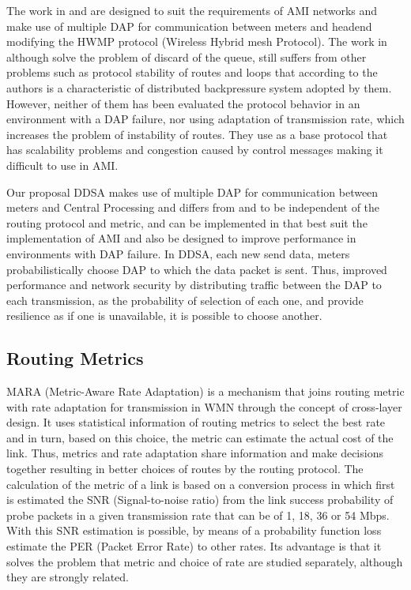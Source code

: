 \documentclass[conference]{IEEEtran}
\begin{document}
The work in \cite{6412861} and \cite{Gharavi2011} are designed to suit the requirements of AMI networks and make use of multiple DAP for communication between meters and headend modifying the HWMP protocol (Wireless Hybrid mesh Protocol). The work in \cite{Gharavi2011} although solve the problem of discard of the queue, still suffers from other problems such as protocol stability of routes and loops that according to the authors is a characteristic of distributed backpressure system adopted by them. However, neither of them has been evaluated the protocol behavior in an environment with a DAP failure, nor using adaptation of transmission rate, which increases the problem of instability of routes. They use as a base protocol that has scalability problems and congestion caused by control messages \cite{5473885} making it difficult to use in AMI.


Our proposal DDSA makes use of multiple DAP for communication between meters and Central Processing and differs from \cite{6412861} and \cite{Gharavi2011} to be independent of the routing protocol and metric, and can be implemented in that best suit the implementation of AMI and also be designed to improve performance in environments with DAP failure.
In DDSA, each new send data, meters probabilistically choose DAP to which the data packet is sent. 
Thus, improved performance and network security by distributing traffic between the DAP to each transmission, as the probability of selection of each one, and provide resilience as if one is unavailable, it is possible to choose another.


\subsection{Routing Metrics}
 

MARA (Metric-Aware Rate Adaptation) \cite{6051505} is a mechanism that joins routing metric with rate adaptation for transmission in WMN through the concept of cross-layer design.
It uses statistical information of routing metrics to select the best rate and in turn, based on this choice, the metric can estimate the actual cost of the link.
Thus, metrics and rate adaptation share information and make decisions together resulting in better choices of routes by the routing protocol.
The calculation of the metric of a link is based on a conversion process in which first is estimated the SNR (Signal-to-noise ratio) from the link success probability of probe packets in a given transmission rate that can be of 1, 18, 36 or 54 Mbps.
With this SNR estimation is possible, by means of a probability function loss estimate the PER (Packet Error Rate) to other rates. Its advantage is that it solves the problem that metric and choice of rate are studied separately, although they are strongly related.
\end{document}
